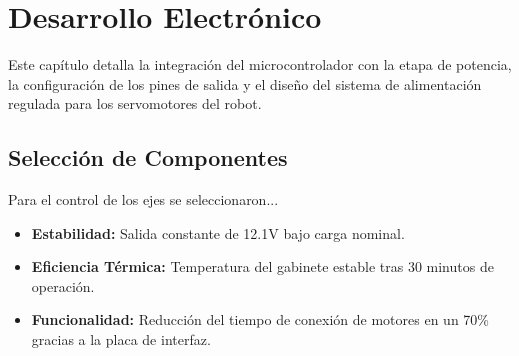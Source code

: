 \chapter{Desarrollo Electrónico}
\lineaLateral

\begin{resumenCapitulo}
	Este capítulo detalla la integración del microcontrolador con la etapa de potencia, la configuración de los pines de salida y el diseño del sistema de alimentación regulada para los servomotores del robot.
\end{resumenCapitulo}

\section{Selección de Componentes}
Para el control de los ejes se seleccionaron...

\begin{resultadosFase}
	\begin{itemize}
		\item \textbf{Estabilidad:} Salida constante de 12.1V bajo carga nominal.
		\item \textbf{Eficiencia Térmica:} Temperatura del gabinete estable tras 30 minutos de operación.
		\item \textbf{Funcionalidad:} Reducción del tiempo de conexión de motores en un 70\% gracias a la placa de interfaz.
	\end{itemize}
\end{resultadosFase}